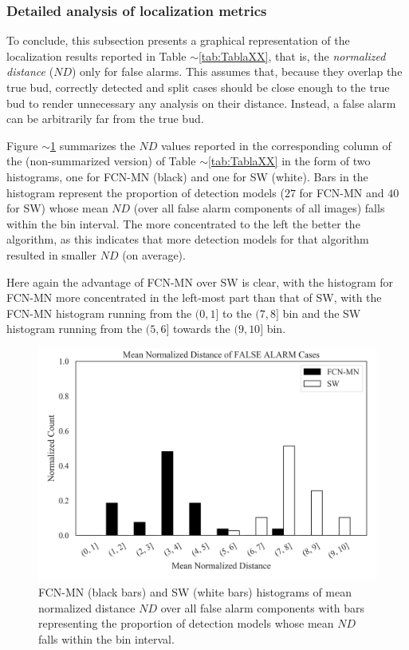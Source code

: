 \documentclass[a4paper,authoryear,review]{elsarticle}
\begin{document}
\subsubsection{Detailed analysis of localization metrics}

To conclude, this subsection presents a graphical representation of the localization results reported in Table $\sim$\ref{tab:TablaXX}, that is,  the \emph{normalized distance} ($ND$) only for false alarms. This assumes that, because they overlap the true bud, correctly detected and split cases should be close enough to the true bud to render unnecessary any analysis on their distance. Instead, a false alarm can be arbitrarily far from the true bud. 

Figure $\sim$\ref{fig:AAA_ND} summarizes the $ND$ values reported in the corresponding column of the (non-summarized version) of Table $\sim$\ref{tab:TablaXX} in the form of two histograms, one for FCN-MN (black) and one for SW (white).  Bars in the histogram represent the proportion of detection models ($27$ for FCN-MN and $40$ for SW) whose mean $ND$ (over all false alarm components of all images) falls within the bin interval. The more concentrated to the left the better the algorithm, as this indicates that more detection models for that algorithm resulted in smaller $ND$ (on average).

Here again the advantage of FCN-MN over SW is clear, with the histogram for FCN-MN more concentrated in the left-most part than that of SW, with the FCN-MN histogram running from the $(0,1]$ to the $(7,8]$ bin and the SW histogram running from the $(5,6]$ towards the $(9,10]$ bin. 

\begin{figure}%
    \centering
  \includegraphics[width=\textwidth]{figures/AAA_normalized_distance_falsealarm_fcn_sw.png}%
\caption{
FCN-MN (black bars) and SW (white bars) histograms of mean normalized distance $ND$ over all false alarm components with bars representing the proportion of detection models whose mean $ND$ falls within the bin interval.
    }
\label{fig:AAA_ND}
\end{figure}
\end{document}
